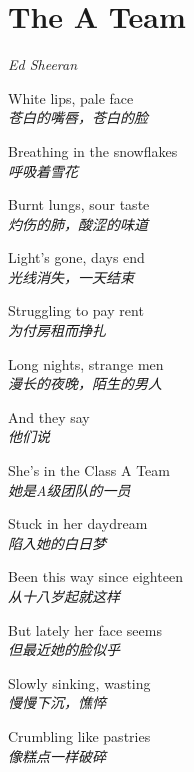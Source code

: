 \section{The A Team}

\thispagestyle{empty}


\begin{center}
\textit{Ed Sheeran}
\end{center}

\vspace{1em}

\begin{spacing}{1.5}
\begin{flushleft}
White lips, pale face\\
\textit{苍白的嘴唇，苍白的脸}\lyricspace

Breathing in the snowflakes\\
\textit{呼吸着雪花}\lyricspace

Burnt lungs, sour taste\\
\textit{灼伤的肺，酸涩的味道}\lyricspace

Light's gone, days end\\
\textit{光线消失，一天结束}\lyricspace

Struggling to pay rent\\
\textit{为付房租而挣扎}\lyricspace

Long nights, strange men\\
\textit{漫长的夜晚，陌生的男人}\lyricspace

And they say\\
\textit{他们说}\lyricspace

She's in the Class A Team\\
\textit{她是A级团队的一员}\lyricspace

Stuck in her daydream\\
\textit{陷入她的白日梦}\lyricspace

Been this way since eighteen\\
\textit{从十八岁起就这样}\lyricspace

But lately her face seems\\
\textit{但最近她的脸似乎}\lyricspace

Slowly sinking, wasting\\
\textit{慢慢下沉，憔悴}\lyricspace

Crumbling like pastries\\
\textit{像糕点一样破碎}\lyricspace


\end{flushleft}
\end{spacing}
